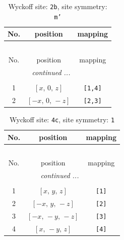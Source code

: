 \documentclass[fleqn,8pt]{jsarticle}
\begin{document}
\begin{longtable}{ccc}
\caption{Wyckoff site: {\tt 2b}, site symmetry: {\tt m'}}
 \\
 \hline \hline
No. & position & mapping \\ \hline \endfirsthead

\multicolumn{2}{l}{\tablename\ \thetable{}} \\
 \hline \hline
No. & position & mapping \\ \hline \endhead

 \hline \hline
\multicolumn{2}{r}{\footnotesize\it continued ...} \\ \endfoot

 \hline \hline
\multicolumn{2}{r}{} \\ \endlastfoot

1 & $\left[ x,\, 0,\, z \right]$ & {\tt [1,4]} \\ \hline
2 & $\left[ - x,\, 0,\, - z \right]$ & {\tt [2,3]} \\
\end{longtable}
\renewcommand{\arraystretch}{1.2}
\begin{longtable}{ccc}
\caption{Wyckoff site: {\tt 4c}, site symmetry: {\tt 1}}
 \\
 \hline \hline
No. & position & mapping \\ \hline \endfirsthead

\multicolumn{2}{l}{\tablename\ \thetable{}} \\
 \hline \hline
No. & position & mapping \\ \hline \endhead

 \hline \hline
\multicolumn{2}{r}{\footnotesize\it continued ...} \\ \endfoot

 \hline \hline
\multicolumn{2}{r}{} \\ \endlastfoot

1 & $\left[ x,\, y,\, z \right]$ & {\tt [1]} \\ \hline
2 & $\left[ - x,\, y,\, - z \right]$ & {\tt [2]} \\ \hline
3 & $\left[ - x,\, - y,\, - z \right]$ & {\tt [3]} \\ \hline
4 & $\left[ x,\, - y,\, z \right]$ & {\tt [4]} \\
\end{longtable}
\end{document}
